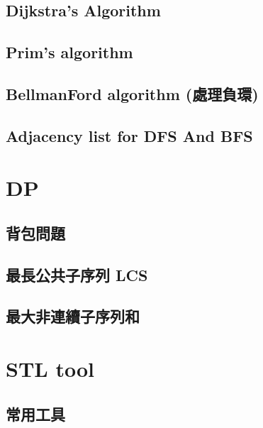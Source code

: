 \subsection{Dijkstra’s Algorithm}


\subsection{Prim’s algorithm}


\subsection{BellmanFord algorithm (處理負環)}


\subsection{Adjacency list for DFS And BFS}






\section{DP}

\subsection{背包問題}


\subsection{最長公共子序列 LCS}


\subsection{最大非連續子序列和}






\section{STL tool}

\subsection{常用工具}


